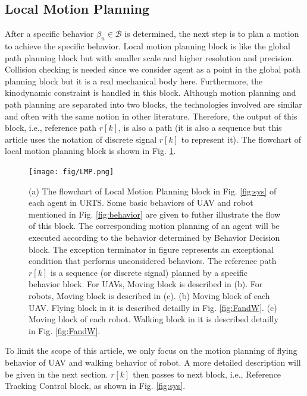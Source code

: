 \documentclass{ieeeaccess}
\begin{document}
\subsection{Local Motion Planning}
After a specific behavior $\beta_n\in\mathcal{B}$ is determined, the next step is to plan a motion to achieve the specific behavior. Local motion planning block is like the global path planning block but with smaller scale and higher resolution and precision. Collision checking is needed since we consider agent as a point in the global path planning block but it is a real mechanical body here. Furthermore, the kinodynamic constraint is handled in this block. Although motion planning and path planning are separated into two blocks, the technologies involved are similar and often with the same notion in other literature. Therefore, the output of this block, i.e., reference path $r[k]$, is also a path (it is also a sequence but this article uses the notation of discrete signal $r[k]$ to represent it). The flowchart of local motion planning block is shown in Fig. \ref{fig:LMP}.
\begin{figure}[htbp]
    \centering
    \texttt{[image: fig/LMP.png]}\caption{
        (a) The flowchart of Local Motion Planning block in Fig. \ref{fig:sys} of each agent in URTS. Some basic behaviors of UAV and robot mentioned in Fig. \ref{fig:behavior} are given to futher illustrate the flow of this block. The corresponding motion planning of an agent will be executed according to the behavior determined by Behavior Decision block. The exception terminator in figure represents an exceptional condition that performs unconsidered behaviors. The reference path $r[k]$ is a sequence (or discrete signal) planned by a specific behavior block. For UAVs, Moving block is described in (b). For robots, Moving block is described in (c). 
        (b) Moving block of each UAV. Flying block in it is described detailly in Fig. \ref{fig:FandW}. 
        (c) Moving block of each robot. Walking block in it is described detailly in Fig. \ref{fig:FandW}.}
    \label{fig:LMP}
\end{figure}

To limit the scope of this article, we only focus on the motion planning of flying behavior of UAV and walking behavior of robot. A more detailed description will be given in the next section. $r[k]$ then passes to next block, i.e., Reference Tracking Control block, as shown in Fig. \ref{fig:sys}.
\end{document}
